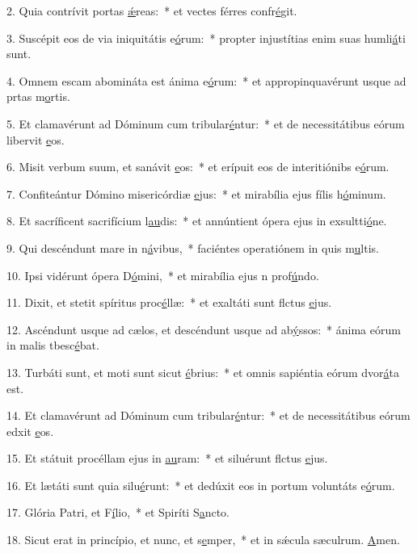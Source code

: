 2. Quia contrívit portas \uline{ǽ}reas:~* et vectes férres confr\uline{é}git.\par 
3. Suscépit eos de via iniquitátis e\uline{ó}rum:~* propter injustítias enim suas humli\uline{á}ti sunt.\par 
4. Omnem escam abomináta est ánima e\uline{ó}rum:~* et appropinquavérunt usque ad prtas m\uline{o}rtis.\par 
5. Et clamavérunt ad Dóminum cum tribular\uline{é}ntur:~* et de necessitátibus eórum libervit \uline{e}os.\par 
6. Misit verbum suum, et sanávit \uline{e}os:~* et erípuit eos de interitiónibs e\uline{ó}rum.\par 
7. Confiteántur Dómino misericórdiæ \uline{e}jus:~* et mirabília ejus fílis h\uline{ó}minum.\par 
8. Et sacríficent sacrifícium l\uline{au}dis:~* et annúntient ópera ejus in exsultti\uline{ó}ne.\par 
9. Qui descéndunt mare in n\uline{á}vibus,~* faciéntes operatiónem in quis m\uline{u}ltis.\par 
10. Ipsi vidérunt ópera D\uline{ó}mini,~* et mirabília ejus n prof\uline{ú}ndo.\par 
11. Dixit, et stetit spíritus proc\uline{é}llæ:~* et exaltáti sunt flctus \uline{e}jus.\par 
12. Ascéndunt usque ad cælos, et descéndunt usque ad ab\uline{ý}ssos:~* ánima eórum in malis tbesc\uline{é}bat.\par 
13. Turbáti sunt, et moti sunt sicut \uline{é}brius:~* et omnis sapiéntia eórum dvor\uline{á}ta est.\par 
14. Et clamavérunt ad Dóminum cum tribular\uline{é}ntur:~* et de necessitátibus eórum edxit \uline{e}os.\par 
15. Et státuit procéllam ejus in \uline{au}ram:~* et siluérunt flctus \uline{e}jus.\par 
16. Et lætáti sunt quia silu\uline{é}runt:~* et dedúxit eos in portum voluntáts e\uline{ó}rum.\par 
17. Glória Patri, et F\uline{í}lio,~* et Spiríti S\uline{a}ncto.\par 
18. Sicut erat in princípio, et nunc, et s\uline{e}mper,~* et in sǽcula sæculrum. \uline{A}men.\par 
